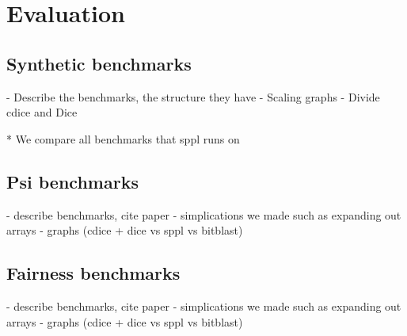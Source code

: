 \section{Evaluation}\label{sec:evaluation}


\subsection{Synthetic benchmarks}\label{sec:synthetic-benchmarks}
- Describe the benchmarks, the structure they have
- Scaling graphs
- Divide cdice and Dice

* We compare all benchmarks that sppl runs on
\subsection{Psi benchmarks}\label{sec:psi-benchmarks}
- describe benchmarks, cite paper
- simplications we made such as expanding out arrays
- graphs (cdice + dice vs sppl vs bitblast)


\subsection{Fairness benchmarks}\label{sec:fairness-benchmarks}
- describe benchmarks, cite paper
- simplications we made such as expanding out arrays
- graphs (cdice + dice vs sppl vs bitblast)


